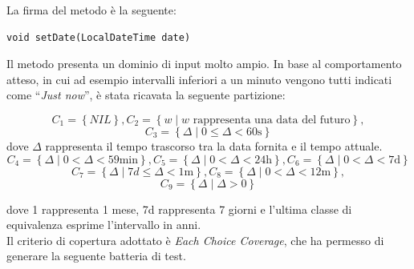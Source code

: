 \noindent La firma del metodo è la seguente:

\begin{minipage}{\linewidth}
\centering\begin{verbatim}
void setDate(LocalDateTime date)
\end{verbatim}
\end{minipage}

\noindent Il metodo presenta un dominio di input molto ampio. In base al 
comportamento atteso, in cui ad esempio intervalli inferiori a un minuto 
vengono tutti indicati come “\textit{Just now}”, è stata ricavata la seguente partizione:

\noindent$$C_{1} =\left\{NIL\right\},
C_2 = \left\{ w \mid w \text{ rappresenta una data del futuro}\right\},$$
$$C_3 = \left\{ \Delta \mid 0 \le \Delta < 60\text{s} \right\}$$
dove $\Delta$ rappresenta il tempo trascorso tra la data fornita e il tempo attuale.
$$C_4 = \left\{ \Delta \mid 0 < \Delta < 59\text{min} \right\},
C_5 = \left\{ \Delta \mid 0 <  \Delta < 24\text{h} \right\},
C_6 = \left\{ \Delta \mid 0 <  \Delta < 7\text{d} \right\}$$
$$C_7 = \left\{ \Delta \mid 7d \le \Delta < 1\text{m} \right\},
C_8 = \left\{ \Delta \mid 0 < \Delta < 12\text{m} \right\},$$
$$C_9 = \left\{ \Delta \mid \Delta > 0 \right\}$$

dove 1 rappresenta 1 mese, 7d rappresenta 7 giorni e l'ultima classe di equivalenza
esprime l'intervallo in anni. \\
\indent Il criterio di copertura adottato è \textit{Each Choice Coverage}, che ha permesso di generare la
seguente batteria di test.

\newpage

